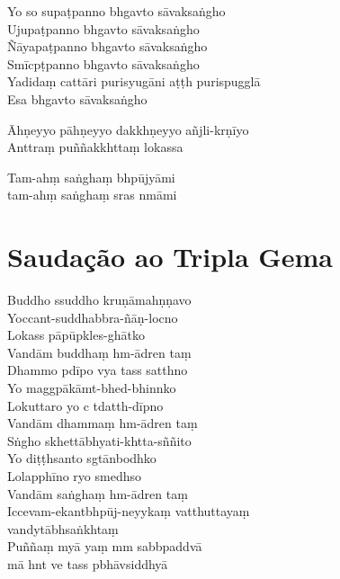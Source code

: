 \begin{leader}
\end{leader}

Yo so supaṭpanno bhgavto sāvaksaṅgho\\
Ujupaṭpanno bhgavto sāvaksaṅgho\\
Ñāyapaṭpanno bhgavto sāvaksaṅgho\\
Smīcpṭpanno bhgavto sāvaksaṅgho\\
Yadidaṃ cattāri purisyugāni aṭṭh purispugglā\\
Esa bhgavto sāvaksaṅgho

Āhṇeyyo pāhṇeyyo dakkhṇeyyo añjli-krṇīyo\\
Anttraṃ puññakkhttaṃ lokassa

Tam-ahṃ saṅghaṃ bhpūjyāmi\\
\vin tam-ahṃ saṅghaṃ sras nmāmi 

\chapter{Saudação ao Tripla Gema}%

\begin{leader}
\end{leader}

Buddho ssuddho kruṇāmahṇṇavo\\
Yoccant-suddhabbra-ñāṇ-locno\\
Lokass pāpūpkles-ghātko\\
Vandām buddhaṃ hm-ādren taṃ\\
Dhammo pdīpo vya tass satthno\\
Yo maggpākāmt-bhed-bhinnko\\
Lokuttaro yo c tdatth-dīpno\\
Vandām dhammaṃ hm-ādren taṃ\\
Sṅgho skhettābhyati-khtta-sññito\\
Yo diṭṭhsanto sgtānbodhko\\
Lolapphīno ryo smedhso\\
Vandām saṅghaṃ hm-ādren taṃ\\
Iccevam-ekantbhpūj-neyykaṃ vatthuttayaṃ\\
vandytābhsaṅkhtaṃ\\
Puññaṃ myā yaṃ mm sabbpaddvā\\
\vin mā hnt ve tass pbhāvsiddhyā

